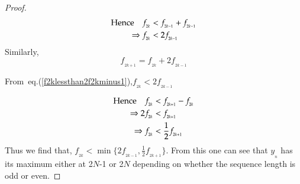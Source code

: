 \begin{multicols}{2}
\begin{proof}
\vspace{-.6cm}

\begin{align}
\textup{Hence}\quad f_{_{2k}} &< f_{_{2k-1}} + f_{_{2k-1}}\nonumber\\
\Rightarrow  f_{_{2k}} &< 2f_{_{2k-1}}\label{eq-17.9}
\end{align}
Similarly,
\begin{equation}
f_{_{2k+1}} = f_{_{2k}} + 2f_{_{2k-1}}\label{eq-17.10}
\end{equation}

\textup{From~eq.(\ref{f2klessthan2f2kminus1})},\quad $f_{_{2k}} < 2f_{_{2k-1}}$

\vspace{-.6cm}

\begin{align}
\textup{Hence}\quad f_{_{2k}} &< f_{_{2k+1}} - f_{_{2k}} \nonumber\\
\Rightarrow 2f_{_{2k}} &< f_{_{2k+1}} \label{eq-17.11}\\
\Rightarrow f_{_{2k}} &< \frac{1}{2}f_{_{2k+1}}\label{eq-17.12}
\end{align}
Thus we find that, $f_{_{2k}} < \min\{2f_{_{2k-1}}, \frac{1}{2}f_{_{2k+1}}\}$. From this one can see that $y_{_n}$ has its maximum either at 2$N$-1 or 2$N$ depending on whether the sequence length is odd or even.
\end{proof}

\vspace{-.6cm}


\end{multicols}
